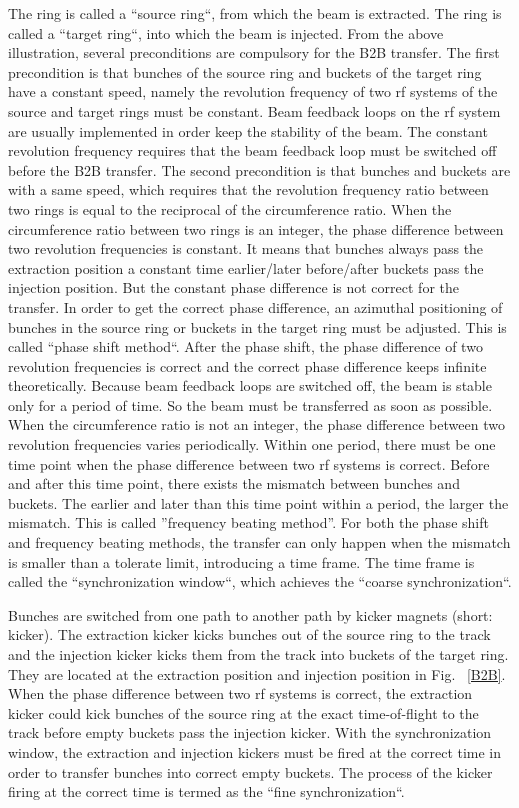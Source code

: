 The ring is called a ``source ring``, from which the beam is extracted. The ring is called a ``target ring``, into which the beam is injected. From the above illustration, several preconditions are compulsory for the B2B transfer. The first precondition is that bunches of the source ring and buckets of the target ring have a constant speed, namely the revolution frequency of two rf systems of the source and target rings must be constant. Beam feedback loops on the rf system are usually implemented in order keep the stability of the beam. The constant revolution frequency requires that the beam feedback loop must be switched off before the B2B transfer. The second precondition is that bunches and buckets are with a same speed, which requires that the revolution frequency ratio between two rings is equal to the reciprocal of the circumference ratio. When the circumference ratio between two rings is an integer, the phase difference between two revolution frequencies is constant. It means that bunches always pass the extraction position a constant time earlier/later before/after buckets pass the injection position. But the constant phase difference is not correct for the transfer. In order to get the correct phase difference, an azimuthal positioning of bunches in the source ring or buckets in the target ring must be adjusted. This is called  ``phase shift method``. After the phase shift, the phase difference of two revolution frequencies is correct and the correct phase difference keeps infinite theoretically. Because beam feedback loops are switched off, the beam is stable only for a period of time. So the beam must be transferred as soon as possible. %
When the circumference ratio is not an integer, the phase difference between two revolution frequencies varies periodically. Within one period, there must be one time point when the phase difference between two rf systems is correct. Before and after this time point, there exists the mismatch between bunches and buckets. The earlier and later than this time point within a period, the larger the mismatch. This is called ''frequency beating method''. For both the phase shift and frequency beating methods, the transfer can only happen when the mismatch is smaller than a tolerate limit, introducing a time frame. The time frame is called the ``synchronization window``, which achieves the ``coarse synchronization``.

Bunches are switched from one path to another path by kicker magnets (short: kicker). The extraction kicker kicks bunches out of the source ring to the track and the injection kicker kicks them from the track into buckets of the target ring. They are located at the extraction position and injection position in Fig. ~\ref{B2B}. When the phase difference between two rf systems is correct, the extraction kicker could kick bunches of the source ring at the exact time-of-flight to the track before empty buckets pass the injection kicker. With the synchronization window, the extraction and injection kickers must be fired at the correct time in order to transfer bunches into correct empty buckets. The process of the kicker firing at the correct time is termed as the ``fine synchronization``.

